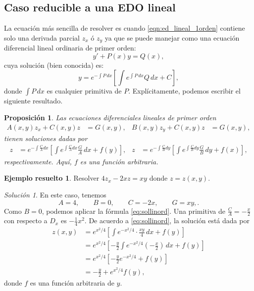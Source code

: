 \documentclass[11pt,letterpaper,draft]{report}
\theoremstyle{plain}
\newtheorem{proposition}[theorem]{Proposición}
\theoremstyle{definition}
\newtheorem{solved}[theorem]{Ejemplo resuelto}
\theoremstyle{remark}
\newtheorem*{solution}{Solución}
\newcommand\<{\langle}
\renewcommand\>{\rangle}
\begin{document}
\subsection{Caso reducible a una EDO lineal}
\label{ssec:una-derivada}
La ecuación más sencilla de resolver es cuando
\ref{eqn:ed_lineal_1orden} contiene solo una derivada
parcial $z_x$ ó $z_y$ ya que se puede manejar como una
ecuación diferencial lineal ordinaria de primer orden:
\begin{equation}
  y' + P(x) y = Q(x)
,\end{equation}
cuya solución (bien conocida) es:
\begin{equation}
  y = e^{-\int P \, dx} \left[\int e^{\int P \, dx}
  Q \, dx + C\right]
,\end{equation}
donde \(\int P\,dx\) es cualquier primitiva de \(P\).
Explícitamente, podemos escribir el siguiente resultado.
\begin{proposition}
  Las ecuaciones diferenciales lineales de primer orden
  \begin{align}
    A(x,y) z_x + C(x,y) z &= G(x,y),
                          &
    B(x,y) z_y + C(x,y) z &= G(x,y),
  \end{align}
  tienen soluciones dadas por
  \begin{align}
    \label{eq:sollinord}
    z &= e^{-\int\frac{C}{A}dx}
    \left[\int e^{\int\frac{C}{A}dx} \tfrac{G}{A} \, dx + f(y)\right],
      &
    z &= e^{-\int\frac{C}{B}dy}
    \left[\int e^{\int\frac{C}{B}dy} \tfrac{G}{B} \, dy + f(x)\right]
  ,\end{align}
  respectivamente. Aquí, \(f\) es una función arbitraria.
\end{proposition}

\begin{solved}
  Resolver $4z_x - 2xz = xy$ donde $z = z(x,y)$.
  \begin{solution}
    En este caso, tenemos
    \begin{equation}
      A=4, \qquad B=0, \qquad C=-2x, \qquad G=xy,
    .\end{equation}
    Como \(B=0\), podemos aplicar la fórmula \eqref{eq:sollinord}.
    Una primitiva de \(\frac{C}{A}=-\frac{x}{2}\) con respecto a
    \(D_x\) es \(-\frac{1}{4}x^{2}\).
    De acuerdo a \eqref{eq:sollinord},
    la solución está dada por
    \begin{align*}
      z(x,y) 
             &= e^{x^{2} / 4}
             \left[\int e^{- x^{2} /4} \cdot \frac{xy}{4} \,
               dx + f(y)\right]\\
             &= e^{x^{2} / 4}
             \left[-\frac{y}{2}\int e^{- x^{2} /4} (-\tfrac{x}{2}) \,
               dx + f(y)\right]\\
             &= e^{x^2 / 4} \left[-\frac{y}{2} e^{- x^2 / 4 } + f(y)\right]\\
             &= -\frac{y}{2} + e^{x^2 / 4 } f(y),
    \end{align*}
    donde $f$ es una función arbitraria de $y$.
  \end{solution}
\end{solved}
\end{document}

